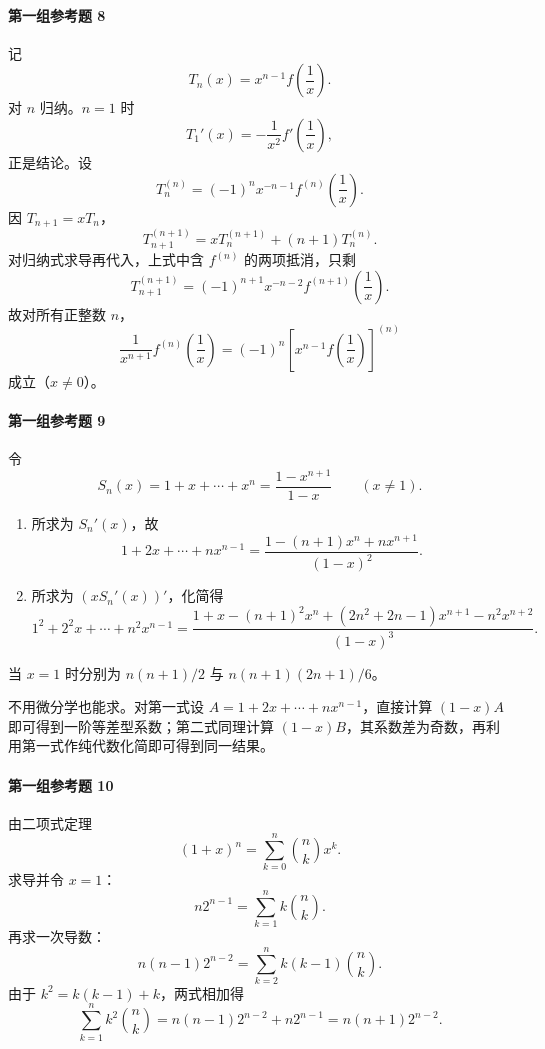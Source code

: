 \paragraph{第一组参考题 8}
\begin{xsolution}
记
\[
  T_n(x)=x^{n-1}f\left(\frac1x\right).
\]
对 $n$ 归纳。$n=1$ 时
\[
  T_1'(x)=-\frac1{x^2}f'\left(\frac1x\right),
\]
正是结论。设
\[
  T_n^{(n)}=(-1)^nx^{-n-1}f^{(n)}\left(\frac1x\right).
\]
因 $T_{n+1}=xT_n$，
\[
  T_{n+1}^{(n+1)}=xT_n^{(n+1)}+(n+1)T_n^{(n)}.
\]
对归纳式求导再代入，上式中含 $f^{(n)}$ 的两项抵消，只剩
\[
  T_{n+1}^{(n+1)}
  =(-1)^{n+1}x^{-n-2}f^{(n+1)}\left(\frac1x\right).
\]
故对所有正整数 $n$，
\[
  \boxed{
  \frac1{x^{n+1}}f^{(n)}\left(\frac1x\right)
  =(-1)^n\left[x^{n-1}f\left(\frac1x\right)\right]^{(n)}}
\]
成立（$x\ne0$）。
\end{xsolution}

\paragraph{第一组参考题 9}
\begin{xsolution}
令
\[
  S_n(x)=1+x+\cdots+x^n=\frac{1-x^{n+1}}{1-x}\qquad(x\ne1).
\]
\begin{enumerate}[label=(\arabic*)]
  \item 所求为 $S_n'(x)$，故
  \[
    \boxed{1+2x+\cdots+nx^{n-1}
    =\frac{1-(n+1)x^n+nx^{n+1}}{(1-x)^2}}.
  \]
  \item 所求为 $(xS_n'(x))'$，化简得
  \[
    \boxed{
    1^2+2^2x+\cdots+n^2x^{n-1}
    =\frac{1+x-(n+1)^2x^n+(2n^2+2n-1)x^{n+1}-n^2x^{n+2}}{(1-x)^3}}.
  \]
\end{enumerate}
当 $x=1$ 时分别为 $n(n+1)/2$ 与 $n(n+1)(2n+1)/6$。

不用微分学也能求。对第一式设 $A=1+2x+\cdots+nx^{n-1}$，直接计算 $(1-x)A$ 即可得到一阶等差型系数；第二式同理计算 $(1-x)B$，其系数差为奇数，再利用第一式作纯代数化简即可得到同一结果。
\end{xsolution}

\paragraph{第一组参考题 10}
\begin{xsolution}
由二项式定理
\[
  (1+x)^n=\sum_{k=0}^n\binom nkx^k.
\]
求导并令 $x=1$：
\[
  n2^{n-1}=\sum_{k=1}^n k\binom nk.
\]
再求一次导数：
\[
  n(n-1)2^{n-2}=\sum_{k=2}^n k(k-1)\binom nk.
\]
由于 $k^2=k(k-1)+k$，两式相加得
\[
  \sum_{k=1}^n k^2\binom nk
  =n(n-1)2^{n-2}+n2^{n-1}
  =\boxed{n(n+1)2^{n-2}}.
\]
\end{xsolution}

